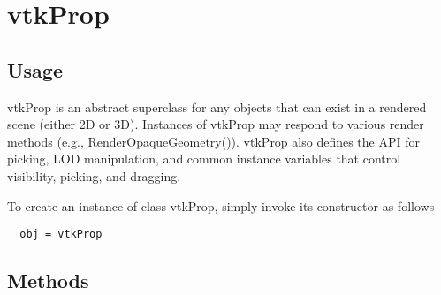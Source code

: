 \section{vtkProp}

\subsection{Usage}

 vtkProp is an abstract superclass for any objects that can exist in a
 rendered scene (either 2D or 3D). Instances of vtkProp may respond to
 various render methods (e.g., RenderOpaqueGeometry()). vtkProp also
 defines the API for picking, LOD manipulation, and common instance 
 variables that control visibility, picking, and dragging.

To create an instance of class vtkProp, simply
invoke its constructor as follows
\begin{verbatim}
  obj = vtkProp
\end{verbatim}
\subsection{Methods}

